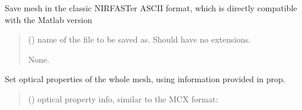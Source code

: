 \documentclass[letterpaper,10pt,english]{sphinxmanual}
\begin{document}
\begin{fulllineitems}

\begin{fulllineitems}
\label{\detokenize{_autosummary/nirfasterff.base.fluor_mesh.fluormesh:nirfasterff.base.fluor_mesh.fluormesh.save_nirfast}}
\pysigstartsignatures
\pysiglinewithargsret
{}
{}
{}
\pysigstopsignatures
\sphinxAtStartPar
Save mesh in the classic NIRFASTer ASCII format, which is directly compatible with the Matlab version
\begin{quote}\begin{description}
\sphinxAtStartPar
{} () \textendash{} name of the file to be saved as. Should have no extensions.

\sphinxAtStartPar
None.

\end{description}\end{quote}

\end{fulllineitems}


\begin{fulllineitems}
\label{\detokenize{_autosummary/nirfasterff.base.fluor_mesh.fluormesh:nirfasterff.base.fluor_mesh.fluormesh.set_prop}}
\pysigstartsignatures
\pysiglinewithargsret
{}
{}
{}
\pysigstopsignatures
\sphinxAtStartPar
Set optical properties of the whole mesh, using information provided in prop.
\begin{quote}\begin{description}
\sphinxAtStartPar
{} () \textendash{} 
\sphinxAtStartPar
optical property info, similar to the MCX format:


\end{description}
\end{quote}
\end{fulllineitems}
\end{fulllineitems}
\end{document}
